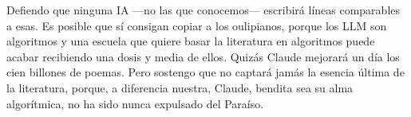 \documentclass[11pt,a4paper]{article}
\begin{document}
Defiendo que ninguna IA ---no las que conocemos--- escribirá líneas comparables a esas. Es posible que sí consigan copiar a los oulipianos, porque los LLM son algoritmos y una escuela que quiere basar la literatura en algoritmos puede acabar recibiendo una dosis y media de ellos. Quizás Claude mejorará un día los cien billones de poemas. Pero sostengo que no captará jamás la esencia última de la literatura, porque, a diferencia nuestra, Claude, bendita sea su alma algorítmica, no ha sido nunca expulsado del Paraíso. 
\end{document}
